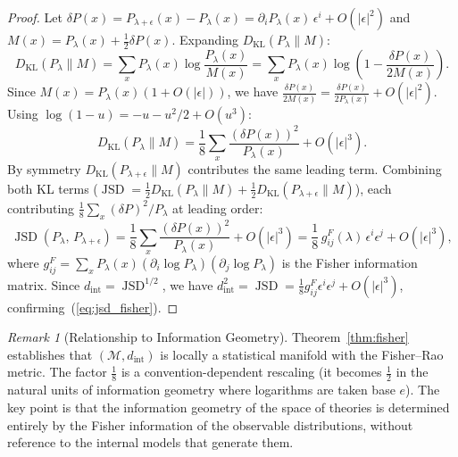 \documentclass[12pt,a4paper]{article}
\theoremstyle{remark}
\newtheorem{remark}{Remark}[section]
\theoremstyle{definition}
\begin{document}
\begin{proof}
Let $\delta P(x) = P_{\lambda+\epsilon}(x) - P_\lambda(x) =
\partial_i P_\lambda(x)\,\epsilon^i + O(|\epsilon|^2)$ and
$M(x) = P_\lambda(x) + \frac{1}{2}\delta P(x)$. Expanding
$D_{\mathrm{KL}}(P_\lambda \| M)$:
\begin{equation*}
  D_{\mathrm{KL}}(P_\lambda \| M)
  = \sum_x P_\lambda(x)\log\frac{P_\lambda(x)}{M(x)}
  = \sum_x P_\lambda(x)\log\!\left(1 - \frac{\delta P(x)}{2M(x)}\right).
\end{equation*}
Since $M(x) = P_\lambda(x)(1 + O(|\epsilon|))$, we have
$\frac{\delta P(x)}{2M(x)} = \frac{\delta P(x)}{2P_\lambda(x)} + O(|\epsilon|^2)$.
Using $\log(1-u) = -u - u^2/2 + O(u^3)$:
\begin{equation*}
  D_{\mathrm{KL}}(P_\lambda \| M)
  = \frac{1}{8}\sum_x \frac{(\delta P(x))^2}{P_\lambda(x)} + O(|\epsilon|^3).
\end{equation*}
By symmetry $D_{\mathrm{KL}}(P_{\lambda+\epsilon}\|M)$ contributes the
same leading term. Combining both KL terms
($\operatorname{JSD} = \frac{1}{2}D_{\mathrm{KL}}(P_\lambda\|M) +
\frac{1}{2}D_{\mathrm{KL}}(P_{\lambda+\epsilon}\|M)$), each contributing
$\frac{1}{8}\sum_x (\delta P)^2/P_\lambda$ at leading order:
\begin{equation*}
  \operatorname{JSD}(P_\lambda,\, P_{\lambda+\epsilon})
  = \frac{1}{8}\sum_x \frac{(\delta P(x))^2}{P_\lambda(x)} + O(|\epsilon|^3)
  = \frac{1}{8}\, g^F_{ij}(\lambda)\,\epsilon^i\epsilon^j + O(|\epsilon|^3),
\end{equation*}
where $g^F_{ij} = \sum_x P_\lambda(x)(\partial_i\log P_\lambda)
(\partial_j\log P_\lambda)$ is the Fisher information matrix. Since
$d_{\mathrm{int}} = \operatorname{JSD}^{1/2}$, we have
$d_{\mathrm{int}}^2 = \operatorname{JSD} = \frac{1}{8}g^F_{ij}\epsilon^i
\epsilon^j + O(|\epsilon|^3)$, confirming~(\ref{eq:jsd_fisher}).
\end{proof}

\begin{remark}[Relationship to Information Geometry]
Theorem~\ref{thm:fisher} establishes that $(\mathcal{M}, d_{\mathrm{int}})$
is locally a statistical manifold \cite{amari2000} with the Fisher--Rao
metric. The factor $\frac{1}{8}$ is a convention-dependent rescaling
(it becomes $\frac{1}{2}$ in the natural units of information geometry
where logarithms are taken base $e$). The key point is that the
information geometry of the space of theories is determined entirely by
the Fisher information of the observable distributions, without reference
to the internal models that generate them.
\end{remark}
\end{document}
